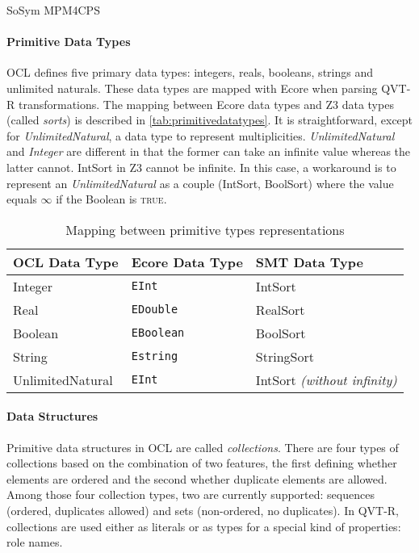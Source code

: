\begin{copiedFrom}{SoSym MPM4CPS}
\paragraph{Primitive Data Types}

OCL defines five primary data types: integers, reals, booleans, strings and unlimited naturals. These data types are mapped with Ecore when parsing QVT-R transformations. The mapping between Ecore data types and Z3 data types (called \textit{sorts}) is described in \autoref{tab:primitivedatatypes}. It is straightforward, except for \textit{UnlimitedNatural}, a data type to represent multiplicities. \textit{UnlimitedNatural} and \textit{Integer} are different in that the former can take an infinite value whereas the latter cannot. IntSort in Z3 cannot be infinite. In this case, a workaround is to represent an \textit{UnlimitedNatural} as a couple (IntSort, BoolSort) where the value equals $\infty$ if the Boolean is \textsc{true}. %

\begin{table}
\renewcommand{\arraystretch}{1.2}%
\setlength\tabcolsep{2 pt}
\begin{tabular}{L{2.4cm} L{2.4cm} L{3.0cm}}
\toprule
\textbf{OCL Data Type} & \textbf{Ecore Data Type} & \textbf{SMT Data Type} \\
\midrule
    Integer & \texttt{EInt} & IntSort \\
    Real    & \texttt{EDouble} & RealSort \\
    Boolean & \texttt{EBoolean} & BoolSort \\
    String  & \texttt{Estring} & StringSort \\
    UnlimitedNatural & \texttt{EInt} & IntSort \textit{(without infinity)}\\
\bottomrule
\end{tabular}
\caption{Mapping between primitive types representations} %
\label{tab:primitivedatatypes}
\end{table}

\paragraph{Data Structures}
Primitive data structures in OCL are called \textit{collections}. There are four types of collections based on the combination of two features, the first defining whether elements are ordered and the second whether duplicate elements are allowed. Among those four collection types, two are currently supported: sequences (ordered, duplicates allowed) and sets (non-ordered, no duplicates). In QVT-R, collections are used either as literals or as types for a special kind of properties: role names.


\end{copiedFrom}
